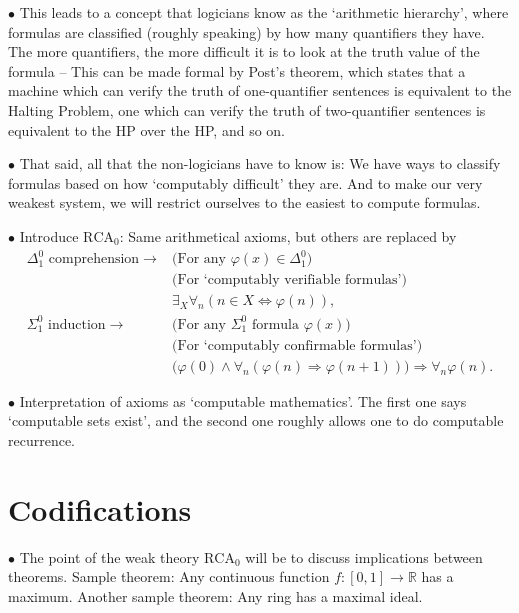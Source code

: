 \documentclass{article}
\theoremstyle{nonumberplain}
\newcommand{\R}{\mathbb{R}}
\newcommand{\RCA}{\mathrm{RCA}}
\newcommand\point[1]{\noindent \hspace{\labelsep} $\bullet$ #1 \smallskip}
\newcommand\timestamp[1]{}
\begin{document}
\point{This leads to a concept that logicians know as the `arithmetic hierarchy', where formulas are classified (roughly speaking) by how many quantifiers they have. The more quantifiers, the more difficult it is to look at the truth value of the formula -- This can be made formal by Post's theorem, which states that a machine which can verify the truth of one-quantifier sentences is equivalent to the Halting Problem, one which can verify the truth of two-quantifier sentences is equivalent to the HP over the HP, and so on.}

\point{That said, all that the non-logicians have to know is: We have ways to classify formulas based on how `computably difficult' they are. And to make our very weakest system, we will restrict ourselves to the easiest to compute formulas.}

\point{Introduce $\RCA_0$: Same arithmetical axioms, but others are replaced by}
\begin{equation}
\begin{aligned}
\text{$\Delta^0_1$ comprehension} \rightarrow{}& \text{(For any $\varphi(x) \in \Delta^0_1$)} \\
 &\text{(For `computably verifiable formulas')}\\
 &\exists_X \forall_n (n \in X \Leftrightarrow \varphi(n)),\\
\text{$\Sigma^0_1$ induction} \rightarrow{}& \text{(For any $\Sigma^0_1$ formula $\varphi(x)$) }\\
&\text{(For `computably confirmable formulas')}\\
& \big(\varphi(0) \land \forall_n (\varphi(n) \Rightarrow \varphi(n+1)) \big) \Rightarrow \forall_n \varphi(n).
\end{aligned}
\end{equation}

\point{Interpretation of axioms as `computable mathematics'. The first one says `computable sets exist', and the second one roughly allows one to do computable recurrence.}

\timestamp{27 minutes}

\section{Codifications}

\point{The point of the weak theory $\RCA_0$ will be to discuss implications between theorems. Sample theorem: Any continuous function $f \colon [0,1] \to \R$ has a maximum. Another sample theorem: Any ring has a maximal ideal.}
\end{document}
